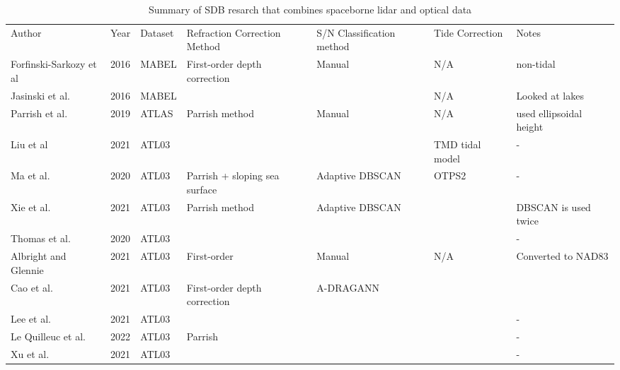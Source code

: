 \begin{landscape}
\begin{table}
  \label{SDB-research-summary}
  \caption{Summary of SDB resarch that combines spaceborne lidar and optical data}
  \centering
  \begin{tabular}{lllllll}
    \midrule
    Author                  & Year & Dataset & Refraction Correction Method  & S/N Classification method & Tide Correction & Notes                    \\
    Forfinski-Sarkozy et al & 2016 & MABEL   & First-order depth correction  & Manual                    & N/A             & non-tidal                \\
    Jasinski et al.         & 2016 & MABEL   &                               &                           & N/A             & Looked at lakes          \\
    Parrish et al.          & 2019 & ATLAS   & Parrish method                & Manual                    & N/A             & used  ellipsoidal height \\
    Liu et al               & 2021 & ATL03   &                               &                           & TMD tidal model & -                        \\
    Ma et al.               & 2020 & ATL03   & Parrish + sloping sea surface & Adaptive  DBSCAN          & OTPS2           & -                        \\
    Xie et al.              & 2021 & ATL03   & Parrish method                & Adaptive DBSCAN           &                 & DBSCAN  is used twice    \\
    Thomas et al.           & 2020 & ATL03   &                               &                           &                 & -                        \\
    Albright and Glennie    & 2021 & ATL03   & First-order                   & Manual                    & N/A             & Converted to NAD83       \\
    Cao et al.              & 2021 & ATL03   & First-order depth correction  & A-DRAGANN                 &                 &                          \\
    Lee et al.              & 2021 & ATL03   &                               &                           &                 & -                        \\
    Le Quilleuc et al.      & 2022 & ATL03   & Parrish                       &                           &                 & -                        \\
    Xu et al.               & 2021 & ATL03   &                               &                           &                 & -                        \\
    \bottomrule
  \end{tabular}
\end{table}
\end{landscape}


